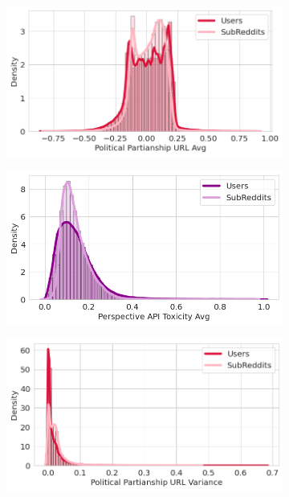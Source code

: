 \begin{figure}
\begin{subfigure}{.48\textwidth}
  \centering
  \includegraphics[width=1\linewidth]{figures/partisanship_avg.png}
 
\label{fig:partisanship-average}
\end{subfigure}%
\begin{subfigure}{.48\textwidth}
  \centering
  \includegraphics[width=1\linewidth]{figures/toxicity_avg.png}
 
 \label{fig:toxicity-average}
\end{subfigure}
\begin{subfigure}{.48\textwidth}
  \centering
  \includegraphics[width=1\linewidth]{figures/partisanship_variance.png}
 

\end{subfigure}
\end{figure}
